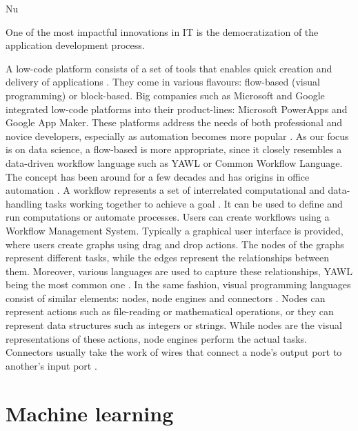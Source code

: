 Nu\documentclass[11pt,twoside, a4paper]{report}
\begin{document}
\setlength{\epigraphwidth}{0.5\textwidth}
\epigraph{One of the most impactful innovations in IT is the democratization of the application development process.}{\textit{\cite{Points2020}}}
 

A low-code platform consists of a set of tools that enables quick creation and delivery of applications \parencite{Waszkowski2019}. They come in various flavours: flow-based (visual programming) or block-based. Big companies such as Microsoft and Google integrated low-code platforms into their product-lines: Microsoft PowerApps and Google App Maker. These platforms address the needs of both professional and novice developers, especially as automation becomes more popular \cite{Points2020}. 
As our focus is on data science, a flow-based is more appropriate, since it closely resembles a data-driven workflow language such as YAWL or Common Workflow Language. The concept has been around for a few decades and has origins in office automation \parencite{TerHofstede2010}. A workflow represents a set of interrelated computational and data-handling tasks working together to achieve a goal \parencite{Gesing2013}. It can be used to define and run computations or automate processes. Users can create workflows using a Workflow Management System. Typically a graphical user interface is provided, where users create graphs using drag and drop actions. The nodes of the graphs represent different tasks, while the edges represent the relationships between them. Moreover, various languages are used to capture these relationships, YAWL being the most common one \parencite{Gesing2013}. In the same fashion, visual programming languages consist of similar elements: nodes, node engines and connectors \parencite{Milicchio2016}. Nodes can represent actions such as file-reading or  mathematical operations, or they can represent data structures such as integers or strings. While nodes are the visual representations of these actions, node engines perform the actual tasks. Connectors usually take the work of wires that connect a node's output port to another's input port \parencite{Dimyadi2016}. 



\section{Machine learning}
\end{document}
